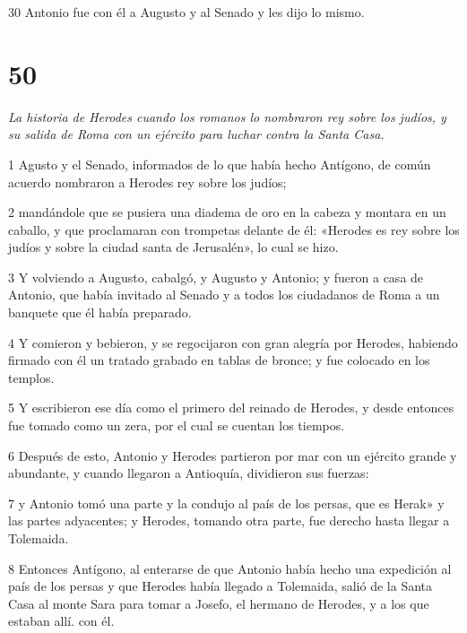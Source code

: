 \par 30 Antonio fue con él a Augusto y al Senado y les dijo lo mismo.

\chapter{50}

\par \textit{La historia de Herodes cuando los romanos lo nombraron rey sobre los judíos, y su salida de Roma con un ejército para luchar contra la Santa Casa.}

\par 1 Agusto y el Senado, informados de lo que había hecho Antígono, de común acuerdo nombraron a Herodes rey sobre los judíos;

\par 2 mandándole que se pusiera una diadema de oro en la cabeza y montara en un caballo, y que proclamaran con trompetas delante de él: «Herodes es rey sobre los judíos y sobre la ciudad santa de Jerusalén», lo cual se hizo.

\par 3 Y volviendo a Augusto, cabalgó, y Augusto y Antonio; y fueron a casa de Antonio, que había invitado al Senado y a todos los ciudadanos de Roma a un banquete que él había preparado.

\par 4 Y comieron y bebieron, y se regocijaron con gran alegría por Herodes, habiendo firmado con él un tratado grabado en tablas de bronce; y fue colocado en los templos.

\par 5 Y escribieron ese día como el primero del reinado de Herodes, y desde entonces fue tomado como un zera, por el cual se cuentan los tiempos.

\par 6 Después de esto, Antonio y Herodes partieron por mar con un ejército grande y abundante, y cuando llegaron a Antioquía, dividieron sus fuerzas:

\par 7 y Antonio tomó una parte y la condujo al país de los persas, que es Herak» y las partes adyacentes; y Herodes, tomando otra parte, fue derecho hasta llegar a Tolemaida.

\par 8 Entonces Antígono, al enterarse de que Antonio había hecho una expedición al país de los persas y que Herodes había llegado a Tolemaida, salió de la Santa Casa al monte Sara para tomar a Josefo, el hermano de Herodes, y a los que estaban allí. con él.

